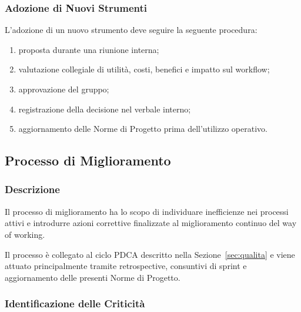 
\subsubsection{Adozione di Nuovi Strumenti}

L'adozione di un nuovo strumento deve seguire la seguente procedura:

\begin{enumerate}
    \item proposta durante una riunione interna;
    \item valutazione collegiale di utilità, costi, benefici e impatto sul workflow;
    \item approvazione del gruppo;
    \item registrazione della decisione nel verbale interno;
    \item aggiornamento delle Norme di Progetto prima dell'utilizzo operativo.
\end{enumerate}


\subsection{Processo di Miglioramento}
\label{sec:miglioramento}

\subsubsection{Descrizione}

Il processo di miglioramento ha lo scopo di individuare inefficienze nei processi
attivi e introdurre azioni correttive finalizzate al miglioramento continuo del
way of working.

Il processo è collegato al ciclo PDCA descritto nella Sezione~\ref{sec:qualita}
e viene attuato principalmente tramite retrospective, consuntivi di sprint e
aggiornamento delle presenti Norme di Progetto.


\subsubsection{Identificazione delle Criticità}

